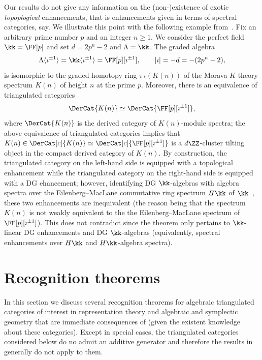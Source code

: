 \documentclass[a4paper]{amsart}
\begin{document}
Our results do not give any information on the (non-)existence of exotic
\emph{topoplogical} enhancements, that is enhancements given in terms of
spectral categories, say. We illustrate this point with the following example
from~\cite[Rmk.~3.2.1]{SS03}. Fix an arbitrary prime number $p$ and an integer
$n\geq1$. We consider the perfect field $\kk=\FF[p]$ and set $d=2p^n-2$ and
$\Lambda=\kk$. The graded algebra
\[
  \Lambda\langle\imath^{\pm1} \rangle=\kk\langle\imath^{\pm1}\rangle=\FF[p][\imath^{\pm1}],\qquad
  |\imath|=-d=-(2p^n-2),
\]
is isomorphic to the graded homotopy ring $\pi_*(K(n))$ of the Morava $K$-theory
spectrum $K(n)$ of height $n$ at the prime $p$. Moreover, there is an equivalence of
triangulated categories
\[
  \label{eq:K(n)}
  \DerCat{K(n)}\simeq\DerCat{\FF[p][\imath^{\pm1}]},
\]
where $\DerCat{K(n)}$ is the derived category of $K(n)$-module spectra; the
above equivalence of triangulated categories implies that
$K(n)\in\DerCat[c]{K(n)}\simeq\DerCat[c]{\FF[p][\imath^{\pm1}]}$ is a
$d\ZZ$-cluster tilting object in the compact derived category of $K(n)$.
By
construction, the triangulated category on the left-hand side is equipped with a
topological enhancement while the triangulated category on the right-hand side is
equipped with a DG ehancement; however, identifying DG $\kk$-algebras with
algebra spectra over the Eilenberg--MacLane commutative ring spectrum $H\kk$ of
$\kk$~\cite{Shi07}, these two enhancements are inequivalent (the reason being
that the spectrum $K(n)$ is not weakly equivalent to the the Eilenberg--MacLane
spectrum of $\FF[p][\imath^{\pm1}]$). This does not contradict
 since the theorem only pertains to 
$\kk$-linear DG enhancements and DG $\kk$-algebras (equivalently, 
spectral enhancements over $H\kk$ and $H\kk$-algebra spectra).

\section{Recognition theorems}
\label{sec:recognition_thms}

In this section we discuss several recognition theorems for algebraic
triangulated categories of interest in representation theory and algebraic and
symplectic geometry that are immediate consequences of
 (given the existent knowledge about these
categories). Except in special cases, the triangulated categories considered
below do no admit an additive generator and therefore the results in
\cite{Mur22} generally do not apply to them.
\end{document}
